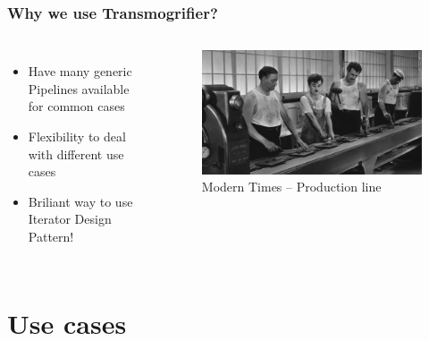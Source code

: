 \documentclass[aspectratio=169]{beamer}
\begin{document}
\begin{frame}
  \frametitle{Why we use Transmogrifier?}

  \begin{columns}
    \begin{itemize}
      \item Have many generic Pipelines available for common cases
      \item Flexibility to deal with different use cases
      \item Briliant way to use Iterator Design Pattern!
    \end{itemize}

    \begin{figure}
      \includegraphics[width=\textwidth]{./img/001_-_modern_times.jpg}
      \caption{Modern Times -- Production line}
    \end{figure}
  \end{columns}
\end{frame}

\section{Use cases}
\end{document}
